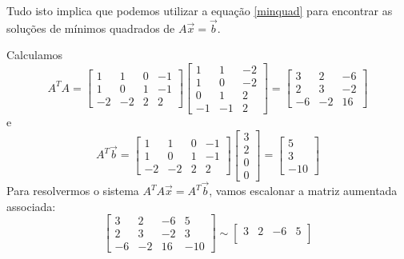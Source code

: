 Tudo isto implica que podemos utilizar a equação \eqref{minquad} para encontrar as soluções de mínimos quadrados de $A \vec{x} = \vec{b}$. 

\begin{ex}\label{exp:minquad2}
  Calculamos
  \begin{equation}
  A^T A =
  \begin{bmatrix}
    1 & 1 & 0 & -1 \\ 1 & 0 & 1 & -1 \\ -2 & -2 & 2 & 2
  \end{bmatrix}
  \begin{bmatrix}
    1 & 1 & -2 \\ 1 & 0 & -2 \\ 0 & 1 & 2 \\ -1 & -1 & 2
  \end{bmatrix} =
  \begin{bmatrix}
    3 & 2 & -6 \\ 2 & 3 & -2 \\ -6 & -2 & 16
  \end{bmatrix}
  \end{equation} e
  \begin{equation}
  A^T \vec{b} =
  \begin{bmatrix}
    1 & 1 & 0 & -1 \\ 1 & 0 & 1 & -1 \\ -2 & -2 & 2 & 2
  \end{bmatrix}
  \begin{bmatrix}
    3 \\ 2 \\ 0 \\ 0
  \end{bmatrix} =
  \begin{bmatrix}
    5 \\ 3 \\ -10
  \end{bmatrix}
  \end{equation} Para resolvermos o sistema $A^TA\vec{x} = A^T\vec{b}$, vamos escalonar a matriz aumentada associada:
  \begin{equation}
  \begin{bmatrix}
    3 & 2 & -6 & 5 \\
    2 & 3 & -2 & 3 \\
    -6 & -2 & 16 & -10
  \end{bmatrix} \sim
  \begin{bmatrix}
    3 & 2 & -6 & 5 \\

\end{bmatrix}
\end{equation}
\end{ex}
